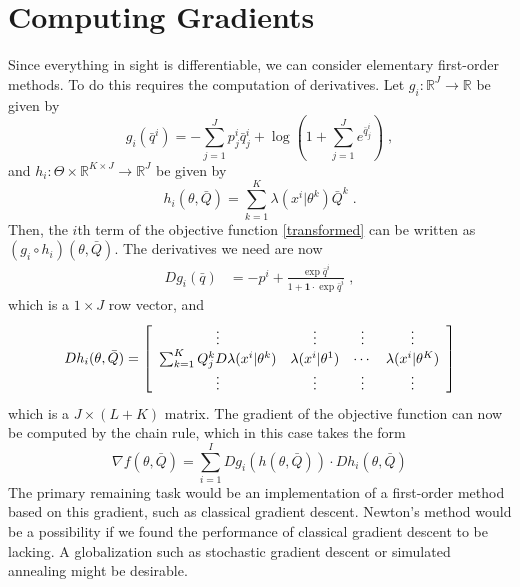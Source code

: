 \documentclass[english]{scrartcl}
\newcommand\R[0]{\mathbb{R}}
\begin{document}
	\section{Computing Gradients}
		Since everything in sight is differentiable, we can consider elementary first-order methods. To do this requires the computation of derivatives. Let $g_i:\R^J \rightarrow \R$ be given by 
		\begin{equation}
			g_i(\bar{q}^i) = - \sum_{j = 1}^J p^i_j \bar{q}^i_j  + \log \left(1 + \sum_{j = 1}^J e^{\bar{q}^i_j}\right)\;,
		\end{equation}
		and $h_i:\Theta \times \R^{K\times J} \rightarrow \R^J$ be given by 
		\begin{equation}
		 	h_i(\theta, \bar{Q}) = \sum_{k=1}^K \lambda(x^i|\theta^k) \bar{Q}^k\;.
		\end{equation} 
		Then, the $i$th term of the objective function \eqref{transformed} can be written as $(g_i \circ h_i)(\theta, \bar{Q})$. The derivatives we need are now 
		\begin{align}
			Dg_i(\bar{q}) &=  -p^i + \frac{\exp \bar{q}^i}{1 + \mathbf{1} \cdot \exp{\bar{q}^i}} \;,
		\end{align}
		which is a $1\times J$ row vector, and 
		\begin{align}
			Dh_i(\theta, \bar{Q}) = \left[\begin{array}{c c c c}
				\vdots & \vdots & \vdots & \vdots \\
				\sum_{k=1}^K Q^k_j D \lambda(x^i|\theta^k) & \lambda(x^i|\theta^1) & \cdots &  \lambda(x^i|\theta^K)\\
				\vdots & \vdots & \vdots & \vdots
			\end{array}\right]
		\end{align}
		which is a $J \times (L + K)$ matrix. The gradient of the objective function can now be computed by the chain rule, which in this case takes the form 
		\begin{equation}
			\nabla f(\theta, \bar{Q}) = \sum_{i=1}^I Dg_i(h(\theta, \bar{Q})) \cdot Dh_i(\theta,\bar{Q})
		\end{equation}
		The primary remaining task would be an implementation of a first-order method based on this gradient, such as classical gradient descent. Newton's method would be a possibility if we found the performance of classical gradient descent to be lacking. A globalization such as stochastic gradient descent or simulated annealing might be desirable. 
\end{document}
